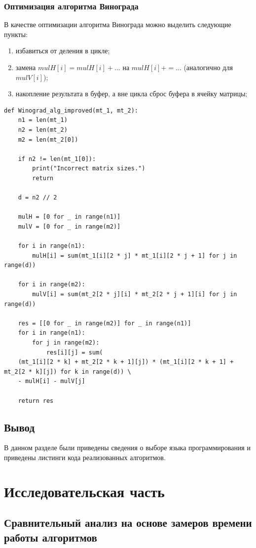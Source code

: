 \documentclass[12pt]{report}
\begin{document}
\subsection{Оптимизация алгоритма Винограда}
В качестве оптимизации алгоритма Винограда можно выделить следующие пункты:
\begin{enumerate}
	\item избавиться от деления в цикле;
	\item замена $mulH[i] = mulH[i] + …$ на $mulH[i] += …$ (аналогично для $mulV[i]$);
	\item накопление результата в буфер, а вне цикла сброс буфера в ячейку матрицы;
\end{enumerate}

\begin{lstlisting}[label=some-code,caption=Оптимизированный алгоритм Винограда]
def Winograd_alg_improved(mt_1, mt_2):
	n1 = len(mt_1)
	n2 = len(mt_2)
	m2 = len(mt_2[0])
	
	if n2 != len(mt_1[0]):
		print("Incorrect matrix sizes.")
		return
	
	d = n2 // 2
	
	mulH = [0 for _ in range(n1)]
	mulV = [0 for _ in range(m2)]
	
	for i in range(n1):
		mulH[i] = sum(mt_1[i][2 * j] * mt_1[i][2 * j + 1] for j in range(d))
	
	for i in range(m2):
		mulV[i] = sum(mt_2[2 * j][i] * mt_2[2 * j + 1][i] for j in range(d))
	
	res = [[0 for _ in range(m2)] for _ in range(n1)]
	for i in range(n1):
		for j in range(m2):
			res[i][j] = sum(
	(mt_1[i][2 * k] + mt_2[2 * k + 1][j]) * (mt_1[i][2 * k + 1] + mt_2[2 * k][j]) for k in range(d)) \
	- mulH[i] - mulV[j]
	
	return res
\end{lstlisting}

\section{Вывод}
В данном разделе были приведены сведения о выборе языка программирования 
и приведены листинги кода реализованных алгоритмов.



\chapter{Исследовательская часть}

\section{Сравнительный анализ на основе замеров времени работы алгоритмов}
\end{document}
